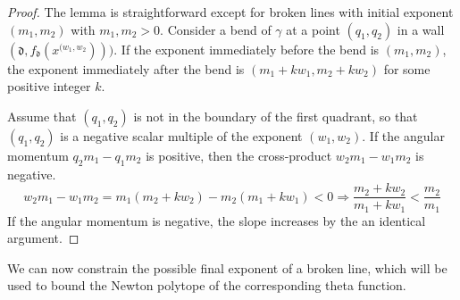 \documentclass[10pt]{amsart}
\theoremstyle{remark}
\numberwithin{equation}{section}
\newcommand{\fd}{\mathfrak{d}}
\begin{document}
\begin{proof}
The lemma is straightforward except for broken lines with initial exponent $(m_1,m_2)$ with $m_1,m_2>0$.  
Consider a bend of $\gamma$ at a point $(q_1,q_2)$ in a wall $(\fd,f_{\fd}(x^{(w_1,w_2})))$.  If the exponent immediately before the bend is $(m_1,m_2)$, the exponent immediately after the bend is $(m_1+kw_1,m_2+kw_2)$ for some positive integer $k$.  

Assume that $(q_1,q_2)$ is not in the boundary of the first quadrant, so that $(q_1,q_2)$ is a negative scalar multiple of the exponent $(w_1,w_2)$. If the angular momentum $q_2m_1-q_1m_2$ is positive, then the cross-product $w_2m_1-w_1m_2$ is negative. 
\[ w_2m_1-w_1m_2=m_1(m_2+kw_2)-m_2(m_1+kw_1)<0 \Rightarrow \frac{m_2+kw_2}{m_1+kw_1} < \frac{m_2}{m_1}\]
If the angular momentum is negative, the slope increases by the an identical argument.
\end{proof}

We can now constrain the possible final exponent of a broken line, which will be used to bound the Newton polytope of the corresponding theta function.
\end{document}

